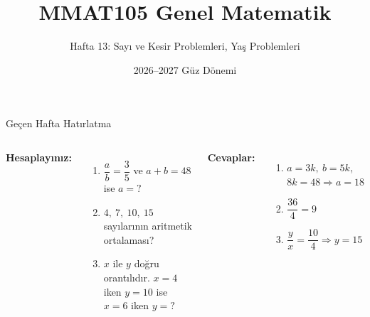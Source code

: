 \documentclass[aspectratio=169,11pt]{beamer}
\title[MMAT105 -- Hafta 13]{MMAT105 Genel Matematik}
\subtitle{Hafta 13: Sayı ve Kesir Problemleri, Yaş Problemleri}
\author{}
\date{2026--2027 Güz Dönemi}
\begin{document}
\begin{frame}
\titlepage
\end{frame}


\begin{frame}{Geçen Hafta Hatırlatma}
\begin{columns}[t]
\textbf{Hesaplayınız:}
\begin{enumerate}
\item \(\dfrac{a}{b}=\dfrac{3}{5}\) ve \(a+b=48\) ise \(a=?\)
\item \(4,\ 7,\ 10,\ 15\) sayılarının aritmetik ortalaması?
\item \(x\) ile \(y\) doğru orantılıdır. \(x=4\) iken \(y=10\) ise \(x=6\) iken \(y=?\)
\end{enumerate}
\pause
\textbf{Cevaplar:}
\begin{enumerate}
\item \(a=3k,\ b=5k\), \(8k=48\Rightarrow a=18\)
\item \(\dfrac{36}{4}=9\)
\item \(\dfrac{y}{x}=\dfrac{10}{4}\Rightarrow y=15\)
\end{enumerate}
\end{columns}
\end{frame}
\end{document}
